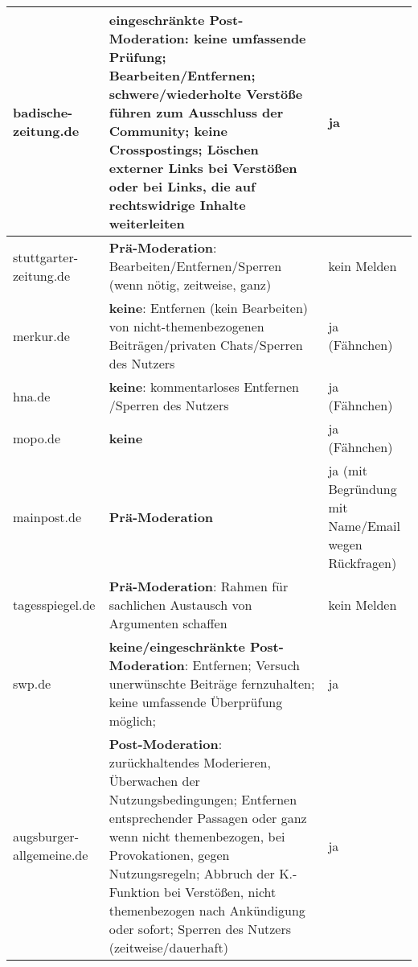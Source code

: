 \begin{landscape}
\begin{longtable}{lp{110mm}p{50mm}}
badische-zeitung.de &
   {\bfseries eingeschränkte Post-Moderation}: keine umfassende Prüfung;
  Bearbeiten/Entfernen; schwere/wiederholte Verstöße führen zum Ausschluss der
  Community; keine Crosspostings; Löschen externer Links bei Verstößen oder bei
  Links, die auf rechtswidrige Inhalte weiterleiten &
  ja \\\midrule

stuttgarter-zeitung.de &
  {\bfseries Prä-Moderation}: Bearbeiten/Entfernen/Sperren (wenn nötig, zeitweise, ganz) &
  kein Melden\\\midrule

merkur.de &
   {\bfseries keine}: Entfernen (kein Bearbeiten) von nicht-themenbezogenen
  Beiträgen/privaten Chats/Sperren des Nutzers &
  ja (Fähnchen) \\\midrule

hna.de &
   {\bfseries keine}: kommentarloses Entfernen /Sperren des Nutzers &
  ja (Fähnchen) \\\midrule

mopo.de &
   {\bfseries keine} &
  ja (Fähnchen) \\\midrule

mainpost.de &
   {\bfseries Prä-Moderation} &
  ja (mit Begründung mit Name/Email wegen Rückfragen) \\\midrule

tagesspiegel.de &
   {\bfseries Prä-Moderation}: Rahmen für sachlichen Austausch von Argumenten schaffen &
  kein Melden \\\midrule

swp.de &
   {\bfseries keine/eingeschränkte Post-Moderation}: Entfernen; Versuch unerwünschte
  Beiträge fernzuhalten; keine umfassende Überprüfung möglich; &
  ja \\\midrule

augsburger-allgemeine.de &
   {\bfseries Post-Moderation}: zurückhaltendes Moderieren, Überwachen der
  Nutzungsbedingungen; Entfernen entsprechender Passagen oder ganz wenn nicht
  themenbezogen, bei Provokationen, gegen Nutzungsregeln; Abbruch der
  K.-Funktion bei Verstößen, nicht themenbezogen nach Ankündigung oder sofort;
  Sperren  des Nutzers (zeitweise/dauerhaft) &
  ja \\

\end{longtable}
\end{landscape}

